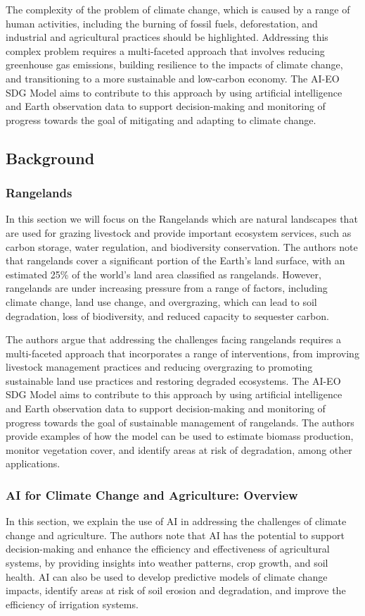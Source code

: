 \documentclass[draft, {\secondLanguage}, english]{volcanica-template}
\begin{document}
The complexity of the problem of climate change, which is caused by a range of human activities, including the burning of fossil fuels, deforestation, and industrial and agricultural practices should be highlighted. Addressing this complex problem requires a multi-faceted approach that involves reducing greenhouse gas emissions, building resilience to the impacts of climate change, and transitioning to a more sustainable and low-carbon economy. The AI-EO SDG Model aims to contribute to this approach by using artificial intelligence and Earth observation data to support decision-making and monitoring of progress towards the goal of mitigating and adapting to climate change.

\subsection{Background}\label{sec:02b}
\subsubsection{Rangelands}\label{sec:02ba}
In this section we will focus on the Rangelands which are natural landscapes that are used for grazing livestock and provide important ecosystem services, such as carbon storage, water regulation, and biodiversity conservation. The authors note that rangelands cover a significant portion of the Earth's land surface, with an estimated 25\% of the world's land area classified as rangelands. However, rangelands are under increasing pressure from a range of factors, including climate change, land use change, and overgrazing, which can lead to soil degradation, loss of biodiversity, and reduced capacity to sequester carbon.

The authors argue that addressing the challenges facing rangelands requires a multi-faceted approach that incorporates a range of interventions, from improving livestock management practices and reducing overgrazing to promoting sustainable land use practices and restoring degraded ecosystems. The AI-EO SDG Model aims to contribute to this approach by using artificial intelligence and Earth observation data to support decision-making and monitoring of progress towards the goal of sustainable management of rangelands. The authors provide examples of how the model can be used to estimate biomass production, monitor vegetation cover, and identify areas at risk of degradation, among other applications.
\subsubsection{AI for Climate Change and Agriculture: Overview}\label{sec:02bb}
In this section, we explain the use of AI in addressing the challenges of climate change and agriculture. The authors note that AI has the potential to support decision-making and enhance the efficiency and effectiveness of agricultural systems, by providing insights into weather patterns, crop growth, and soil health. AI can also be used to develop predictive models of climate change impacts, identify areas at risk of soil erosion and degradation, and improve the efficiency of irrigation systems.
\end{document}
